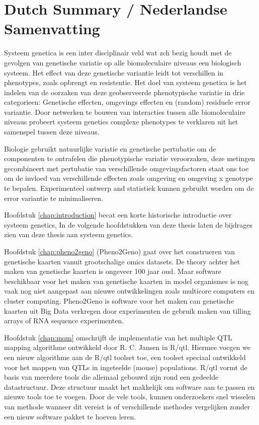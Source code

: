 \section{Dutch Summary / Nederlandse Samenvatting}
Systeem genetica is een inter disciplinair veld wat zch bezig houdt met de gevolgen van 
genetische variatie op alle biomoleculaire niveaus een biologisch systeem. Het effect van 
deze genetische variantie leidt tot verschillen in phenotypes, zoals opbrengt en resistentie. 
Het doel van systeem genetica is het indelen van de oorzaken van deze geobserveerde 
phenotypische variatie in drie categorieen: Genetische effecten, omgevings effecten en 
(random) residuele error variantie. Door netwerken te bouwen van interacties tussen 
alle biomoleculaire niveaus probeert systeem genetics complexe phenotypes te verklaren uit 
het samenspel tussen deze niveaus.

Biologie gebruikt natuurlijke variatie en genetische pertubatie om de componenten te ontrafelen
die phenotypische variatie veroorzaken, deze metingen gecombineert met pertubatie van verschillende 
omgevingsfactoren staat ons toe om de invloed van verschillende effecten zoals omgeving en 
omgeving x genotype te bepalen. Experimenteel ontwerp and statistiek kunnen gebruikt worden om 
de error variantie te minimaliseren.

Hoofdstuk \ref{chap:introduction} becat een korte historische introductie over systeem genetics, 
In de volgende hoofdstukken van deze thesis laten de bijdrages zien van deze thesis aan systeem genetics.

Hoofdstuk \ref{chap:pheno2geno} (Pheno2Geno) gaat over het construeren van genetische kaarten vanuit grootschalige 
omics datasets. De theory achter het maken van genetische kaarten is ongeveer 100 jaar oud. Maar 
software beschikbaar voor het maken van genetische kaarten in model organismes is nog 
vaak nog niet aangepast aan nieuwe ontwikkelingen zoals multicore computers en cluster computing. 
Pheno2Geno is software voor het maken can genetische kaarten uit Big Data verkregen door 
experimenten de gebruik maken van tilling arrays of RNA sequence experimenten.

Hoofdstuk \ref{chap:mqm} omschrijft de implementatie van het multiple QTL mapping algorithme ontwikkeld door 
R. C. Jansen in R/qtl. Hiermee voegen we een nieuw algorithme aan de R/qtl toolset toe, een 
toolset speciaal ontwikkeld voor het mappen van QTLs in ingeteelde (mouse) populations. R/qtl 
vormt de basis van meerdere tools die allemaal gebouwd zijn rond een gedeelde datastructuur. 
Deze structuur maakt het makkelijk om software aan te passen en nieuwe tools toe te voegen.
Door de vele tools, kunnen onderzoekers snel wisselen van methode wanneer dit vereist is of 
verschillende methodes vergelijken zonder een nieuw software pakket te hoeven leren.


